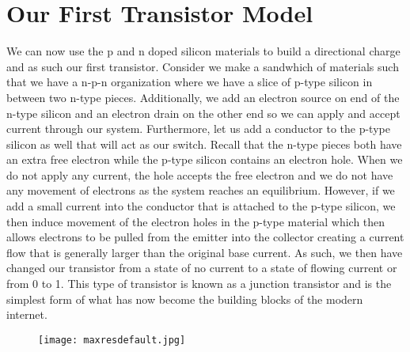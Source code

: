 \documentclass{article}
\begin{document}
\section{Our First Transistor Model}
We can now use the p and n doped silicon materials to build a directional charge and as such our first transistor. Consider we make a sandwhich of materials such that we have a n-p-n organization where we have a slice of p-type silicon in between two n-type pieces. Additionally, we add an electron source on end of the n-type silicon and an electron drain on the other end so we can apply and accept current through our system. Furthermore, let us add a conductor to the p-type silicon as well that will act as our switch. Recall that the n-type pieces both have an extra free electron while the p-type silicon contains an electron hole. When we do not apply any current, the hole accepts the free electron and we do not have any movement of electrons as the system reaches an equilibrium. However, if we add a small current into the conductor that is attached to the p-type silicon, we then induce movement of the electron holes in the p-type material which then allows electrons to be pulled from the emitter into the collector creating a current flow that is generally larger than the original base current. As such, we then have changed our transistor from a state of no current to a state of flowing current or from 0 to 1. This type of transistor is known as a junction transistor and is the simplest form of what has now become the building blocks of the modern internet. 
\begin{figure}
  \texttt{[image: maxresdefault.jpg]}
\end{figure}
\end{document}
